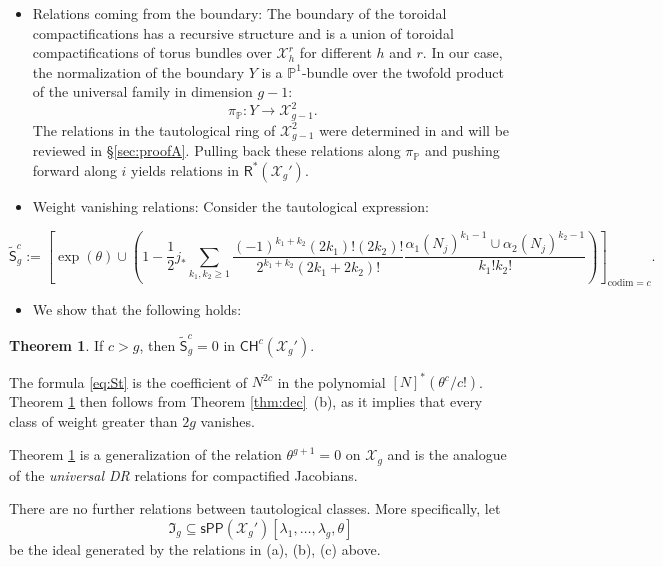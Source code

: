 \documentclass[11pt]{article}
\def\CH{\mathsf{CH}}
\def\R{\mathsf{R}}
\def\X{\mathcal{X}}
\def\codim{\mathrm{codim}}
\newcommand{\sfS}{\mathsf{S}}
\newcommand{\sPP}{\mathsf{sPP}}
\theoremstyle{definition}
\newtheorem{theoremintro}{Theorem}
\begin{document}
\begin{itemize}
    \item[(b)] Relations coming from the boundary: The boundary of the toroidal compactifications has a recursive structure and is a union of toroidal compactifications of torus bundles over $\mathcal X_h^r$ for different $h$ and $r$. In our case, the normalization of the boundary $Y$ is a $\mathbb P^1$-bundle over the twofold product of the universal family in dimension $g-1$:
    $$
    \pi_{\mathbb P} : Y \to \X_{g-1}^2.
    $$
    The relations in the tautological ring of $\X_{g-1}^2$ were determined in \cite{GZ} and will be reviewed in \S\ref{sec:proofA}. Pulling back these relations along $\pi_{\mathbb P}$ and pushing forward along $i$ yields relations in $\R^*(\mathcal{X}_g')$.
    \item[(c)] Weight vanishing relations: Consider the tautological expression:
\end{itemize}
    \begin{equation}\label{eq:St}
    \widetilde{\sfS}_g^c := \left[
    \exp(\theta)\cup
    \left(
    1-
    \frac{1}{2}j_*
    \sum_{k_1,k_2\ge 1} \frac{(-1)^{k_1+k_2}(2k_1)!(2k_2)!}{2^{k_1+k_2}(2k_1+2k_2)!}
    \frac{\alpha_1(N_j)^{k_1-1}\cup\alpha_{2}(N_j)^{k_2-1}}{k_1!k_2!}
    \right)
    \right]_{\codim = c}.
    \end{equation}
    \begin{itemize}
        \item[] We show that the following holds:
    \end{itemize}

\begin{theoremintro}\label{thm:rel}
    If $c > g$, then $\widetilde{\sfS}_g^c = 0$ in $\CH^c(\X_g')$.
\end{theoremintro}

The formula \eqref{eq:St} is the coefficient of $N^{2c}$ in the polynomial $[N]^*(\theta^c/c!)$. Theorem \ref{thm:rel} then follows from Theorem \ref{thm:dec}~(b), as it implies that every class of weight greater than $2g$ vanishes.

Theorem \ref{thm:rel} is a generalization of the relation $\theta^{g+1}=0$ on $\mathcal X_g$ and is the analogue of the \emph{universal DR} relations \cite[Theorem 0.8]{BHPSS} for compactified Jacobians.

There are no further relations between tautological classes. More specifically, let
$$
\mathfrak I_g\subseteq \sPP(\X_g')[\lambda_1, \ldots , \lambda_g, \theta]
$$
be the ideal generated by the relations in (a), (b), (c) above.
\end{document}
